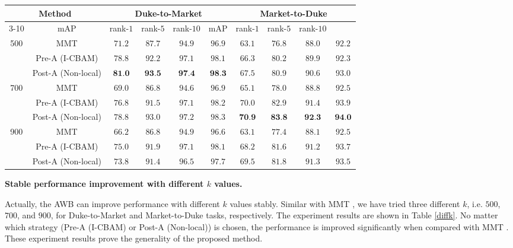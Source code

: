 \documentclass[journal]{IEEEtran}
\begin{document}
\begin{table*}
\centering
\caption{The performance of the proposed AWB under different $k$ values. AWB outperforms MMT \cite{ge2020mutual} continuously.} 
  \begin{tabular}{|*{10}{c|}}\hline
    \multicolumn{2}{|c|}{\multirow{2}{*}{Method}}  & \multicolumn{4}{c|}{Duke-to-Market} & \multicolumn{4}{c|}{Market-to-Duke}\\\cline{3-10}
    \multicolumn{2}{|c|}{}   & mAP & rank-$1$ & rank-$5$ & rank-$10$ & mAP & rank-$1$ & rank-$5$ & rank-$10$ \\\hline
    \multirow{3}{*}{500} & MMT \cite{ge2020mutual} & $71.2$ & $87.7$ & $94.9$ & $96.9$ & $63.1$ & $76.8$ & $88.0$ & $92.2$ \\\cline{2-2}
        & Pre-A (I-CBAM) & $78.8$ &$92.2$ & $97.1$ & $98.1$ & $66.3$ & $80.2$ & $89.9$ & $92.3$ \\\cline{2-2}
        & Post-A (Non-local) & $\textbf{81.0}$ & $\textbf{93.5}$ & $\textbf{97.4}$ & $\textbf{98.3}$ & $67.5$ & $80.9$ & $90.6$ & $93.0$ \\\hline
    \multirow{3}{*}{700} & MMT \cite{ge2020mutual} & $69.0$ & $86.8$ & $94.6$ & $96.9$ & $65.1$ & $78.0$ & $88.8$ & $92.5$ \\\cline{2-2}
        & Pre-A (I-CBAM) & $76.8$ & $91.5$ & $97.1$ & $98.2$ & $70.0$ & $82.9$ & $91.4$ & $93.9$ \\\cline{2-2}
        & Post-A (Non-local) & $78.8$ & $93.0$ & $97.2$ & $98.3$ & $\textbf{70.9}$ & $\textbf{83.8}$ & $\textbf{92.3}$ & $\textbf{94.0}$ \\\hline
    \multirow{3}{*}{900} & MMT \cite{ge2020mutual} & $66.2$ & $86.8$ & $94.9$ & $96.6$ & $63.1$ & $77.4$ & $88.1$ & $92.5$ \\\cline{2-2}
        & Pre-A (I-CBAM)& $75.0$ & $91.9$ & $97.1$ & $98.1$ &$68.2$ & $81.6$ & $91.2$ & $93.7$ \\\cline{2-2}
        & Post-A (Non-local) & $73.8$ & $91.4$ & $96.5$ & $97.7$ & $69.5$ & $81.8$ & $91.3$& $93.5$ \\\hline
  \end{tabular}
\label{diffk}
\end{table*}










\textbf{Stable performance improvement with different $k$ values.}\par 
Actually, the AWB can improve performance with different $k$ values stably. Similar with MMT \cite{ge2020mutual}, we have tried three different $k$, i.e. $500$, $700$, and $900$, for Duke-to-Market and Market-to-Duke tasks, respectively. The experiment results are shown in Table \ref{diffk}. No matter which strategy (Pre-A (I-CBAM) or Post-A (Non-local)) is chosen, the performance is improved significantly when compared with MMT \cite{ge2020mutual}. These experiment results prove the generality of the proposed method. \par
\end{document}
